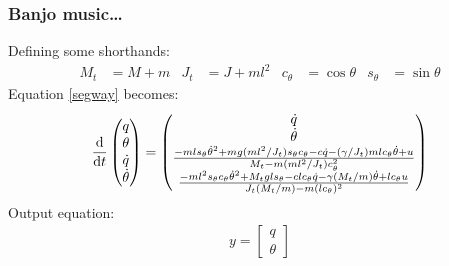 \documentclass[10pt]{beamer-control}
\begin{document}
\begin{frame}
  \frametitle{Banjo music\dots}
  Defining some shorthands:
  \begin{align}
    M_t &= M+m & J_t&=J+ml^2 & c_\theta&=\cos\theta & s_\theta &= \sin\theta
  \end{align}
  Equation \eqref{segway} becomes:
  \begin{align}
    \frac{\mathrm{d} }{\mathrm{d} t}
    \begin{pmatrix}
      q \\
      \theta \\
      \dot{q} \\
      \dot{\theta}
    \end{pmatrix}
    =
    \begin{pmatrix}
      \dot{q} \\
      \dot{\theta} \\
      \frac{-ml s_\theta \dot{\theta}^2 + mg(ml^2/J_t) s_\theta c_\theta - c \dot{q} - (\gamma/J_t) ml c_\theta \dot{\theta} + u}
      {M_t - m(ml^2/J_t) c_\theta^2} \\
      \frac{-ml^2 s_\theta c_\theta \dot{\theta}^2 + M_t gl s_\theta - cl c_\theta \dot{q} - \gamma(M_t/m) \dot{\theta} + lc_\theta u}
      {J_t (M_t/m) - m(lc_\theta)^2}
    \end{pmatrix}
  \end{align}
  Output equation:
  \begin{align}
    y = \begin{bmatrix}
      q\\\theta
    \end{bmatrix}
  \end{align}

\end{frame}
\end{document}
